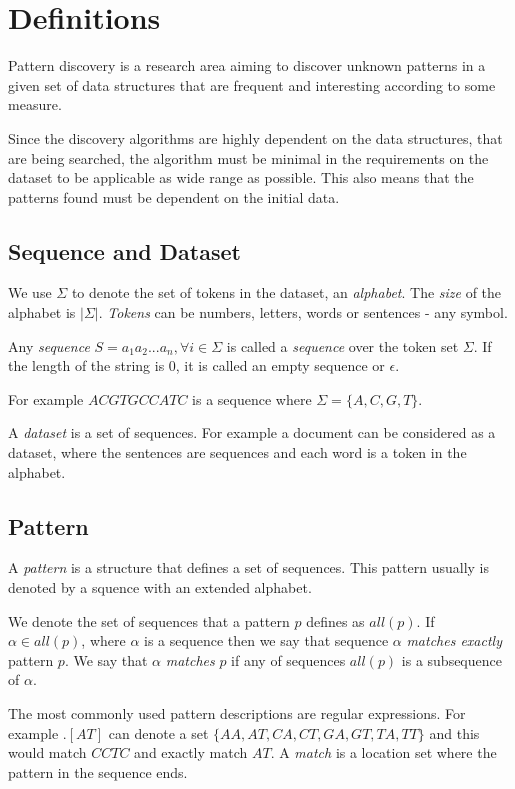 \chapter{Definitions}

Pattern discovery is a research area aiming to discover unknown patterns
in a given set of data structures that are frequent and interesting according 
to some measure.

Since the discovery algorithms are highly dependent on the
data structures, that are being searched, the algorithm must be minimal
in the requirements on the dataset to be applicable as wide range as possible.
This also means that the patterns found must be dependent on the initial data.


\section{Sequence and Dataset}

We use $\Sigma$ to denote the set of tokens in the dataset, an \emph{alphabet}. 
The \emph{size} of the alphabet is $|\Sigma|$. \emph{Tokens} can be numbers, 
letters, words or sentences - any symbol.

Any \emph{sequence} $S=a_1 a_2 ... a_n, \forall i \in \Sigma$ is called a \emph{sequence} 
over the token set $\Sigma$. If the length of the
string is $0$, it is called an empty sequence or $\epsilon$.

For example $ACGTGCCATC$ is a sequence where $\Sigma = \{A, C, G, T\}$.

A \emph{dataset} is a set of sequences. For example a document can be considered
as a dataset, where the sentences are sequences and each word is a token in the alphabet.

\section{Pattern}

A \emph{pattern} is a structure that defines a set of sequences. 
This pattern usually is denoted by a squence with an extended alphabet.

We denote the set of sequences that a pattern $p$ defines as $all(p)$.
If $\alpha \in all(p)$, where $\alpha$ is a sequence then we say that
sequence $\alpha$ \emph{matches exactly} pattern $p$. We say that $\alpha$
\emph{matches} $p$ if any of sequences $all(p)$ is a subsequence of $\alpha$.

The most commonly used pattern descriptions are regular expressions.
For example $.[AT]$ can denote a set $\{AA, AT, CA, CT, GA, GT, TA, TT\}$ and
this would match $CCTC$ and exactly match $AT$. A \emph{match} is a location
set where the pattern in the sequence ends.

